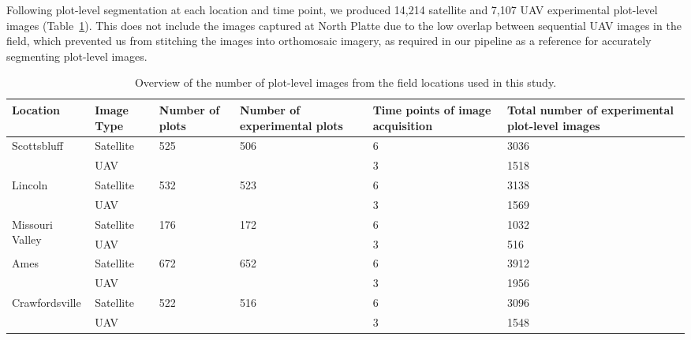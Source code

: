\documentclass[12pt,twoside]{gsag3jnl}
\begin{document}
Following plot-level segmentation at each location and time point, we produced 14,214 satellite and 7,107 UAV experimental plot-level images (Table~\ref{tab:imageitemize}). This does not include the images captured at North Platte due to the low overlap between sequential UAV images in the field, which prevented us from stitching the images into orthomosaic imagery, as required in our pipeline as a reference for accurately segmenting plot-level images. 

\begin{table}[h]
\centering

\begin{tableminipage}{\textwidth}
\begin{tabularx}{\textwidth}{l p{2.0cm} p{2.0cm} p{3.0cm} p{3.0cm} p{3cm}}
\hline
{\bf Location} & {\bf Image Type} & {\bf Number of plots} & {\bf Number of experimental plots} & {\bf Time points of image acquisition} & {\bf Total number of experimental plot-level images}\\
\hline
\multirow{2}{*}{Scottsbluff} & Satellite    & \multirow{2}{*}{525} & \multirow{2}{*}{506}  & 6 & 3036 \\ 
                           & UAV & &  & 3 & 1518 \\ \hline
\multirow{2}{*}{Lincoln} & Satellite    & \multirow{2}{*}{532} & \multirow{2}{*}{523} & 6 & 3138  \\
                           & UAV    &  &   & 3 & 1569 \\ \hline
\multirow{2}{*}{Missouri Valley} & Satellite    & \multirow{2}{*}{176} &\multirow{2}{*}{172} & 6 & 1032  \\
                           & UAV    &  &  & 3 & 516 \\ \hline
\multirow{2}{*}{Ames} & Satellite    & \multirow{2}{*}{672} & \multirow{2}{*}{652}  & 6 & 3912  \\
                           & UAV    &  &   & 3 & 1956 \\ \hline
\multirow{2}{*}{Crawfordsville} & Satellite    & \multirow{2}{*}{522} & \multirow{2}{*}{516}  & 6 & 3096  \\
                           & UAV    &  &   & 3 & 1548 \\ \hline
\end{tabularx}
\caption{Overview of the number of plot-level images from the field locations used in this study.}
\label{tab:imageitemize}
\end{tableminipage}
\end{table}
\end{document}
